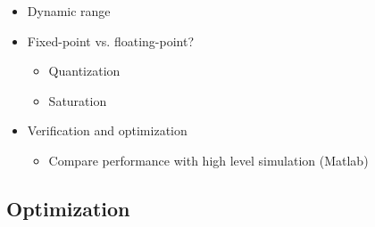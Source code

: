 \begin{itemize}
\begin{itemize}
\begin{itemize}
		\end{itemize}
		\item Dynamic range
		\item Fixed-point vs. floating-point?
		\begin{itemize}
			\item Quantization
			\item Saturation
		\end{itemize}
		\item Verification and optimization
		\begin{itemize}
			\item Compare performance with high level simulation (Matlab)
		\end{itemize}
	\end{itemize}
\end{itemize}
\subsection{Optimization}
